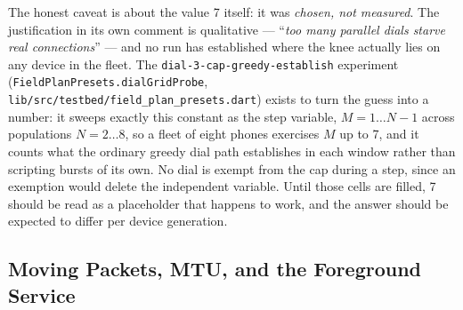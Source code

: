 \documentclass[11pt]{report}
\newcommand{\code}[1]{\texttt{\small #1}}
\begin{document}
The honest caveat is about the value 7 itself: it was \emph{chosen, not measured}. The justification in its own comment is qualitative --- ``\emph{too many parallel dials starve real connections}'' --- and no run has established where the knee actually lies on any device in the fleet. The \code{dial-3-cap-greedy-establish} experiment (\code{FieldPlanPresets.dialGridProbe}, \code{lib/src/testbed/field\_plan\_presets.dart}) exists to turn the guess into a number: it sweeps exactly this constant as the step variable, $M = 1 \ldots N-1$ across populations $N = 2 \ldots 8$, so a fleet of eight phones exercises $M$ up to 7, and it counts what the ordinary greedy dial path establishes in each window rather than scripting bursts of its own. No dial is exempt from the cap during a step, since an exemption would delete the independent variable. Until those cells are filled, 7 should be read as a placeholder that happens to work, and the answer should be expected to differ per device generation.

\subsection{Moving Packets, MTU, and the Foreground Service}
\end{document}
